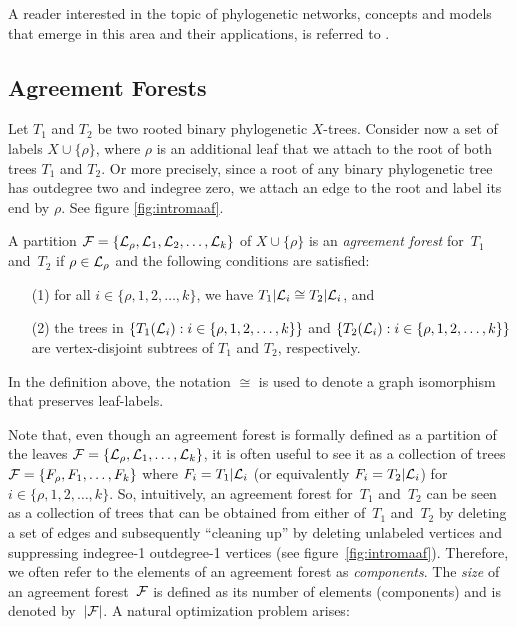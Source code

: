 {
A reader interested in the topic of phylogenetic networks, concepts and models that emerge in this area and their applications, is referred to 
\cite{HRS2011,surveycombinatorial2011,Nakhleh2009ProbSolv,Semple2007}.
}

\subsection*{Agreement Forests}

Let $T_1$ and $T_2$ be two rooted binary phylogenetic $X$-trees. Consider now a set of labels $X\cup\{\rho\}$, where $\rho$ is an additional leaf that we attach to the root of both trees $T_1$ and $T_2$. Or more precisely, since a root of any binary phylogenetic tree has outdegree two and indegree zero, we attach an edge to the root and label its  end by $\rho$. See figure \ref{fig:intromaaf}.


{A partition ${\mathcal F}=\{{\mathcal L}_\rho,{\mathcal L}_1,{\mathcal L}_2,\ldots,{\mathcal L}_k\}$ of $X\cup\{\rho\}$ is an {\it agreement forest} for~$T_1$ and~$T_2$ if $\rho\in{\mathcal L}_\rho$ and the following conditions are satisfied:}
\begin{itemize}
\item[(1)] for all $i\in\{\rho,1,2,\ldots,k\}$, we have $T_1|{\mathcal L}_i \cong T_2|{\mathcal L}_i$, and
\item[(2)] the trees in $\{T_1({\mathcal L}_i): i\in\{\rho,1,2,\ldots,k\}\}$ and $\{T_2({\mathcal L}_i): i\in\{\rho,1,2,\ldots,k\}\}$ are vertex-disjoint subtrees of $T_1$ and $T_2$, respectively.
\end{itemize}
In the definition above, the notation $\cong$ is used to denote a graph isomorphism that preserves leaf-labels.

Note that, even though an agreement forest is formally defined as a partition of the leaves ${\mathcal F}=\{{\mathcal L}_\rho,{\mathcal L}_1,\ldots,{\mathcal L}_k\}$, it is often useful to see it as a collection of trees ${\mathcal F}=\{F_{\rho}, F_1,\ldots, F_k\}$ where $F_i=T_1|{\mathcal L}_i$ (or equivalently $F_i=T_2|{\mathcal L}_i$) for $i\in\{\rho,1,2,\ldots,k\}$. So, intuitively, an agreement forest for~$T_1$ and~$T_2$ can be seen as a collection of trees that can be obtained from either of~$T_1$ and~$T_2$ by deleting a set of edges and subsequently ``cleaning up'' by deleting unlabeled vertices and suppressing indegree-1 outdegree-1 vertices (see figure~\ref{fig:intromaaf}). Therefore, we often refer to the elements of an agreement forest as \emph{components}. The \emph{size} of an agreement forest~${\mathcal F}$ is defined as its number of elements (components) and is denoted by~$|{\mathcal F}|$. 
{A natural optimization problem arises:}\\


